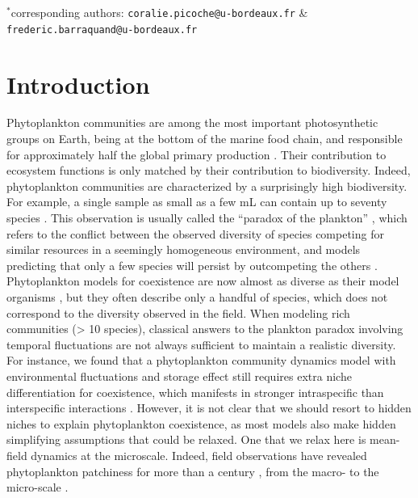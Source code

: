 \documentclass[english]{article}
\begin{document}
$^{*}$corresponding authors: \verb|coralie.picoche@u-bordeaux.fr| \& \verb|frederic.barraquand@u-bordeaux.fr|

\doublespacing

\clearpage{}


\section*{Introduction}

Phytoplankton communities are among the most important photosynthetic
groups on Earth, being at the bottom of the marine food chain, and
responsible for approximately half the global primary production \citep{field_primary_1998}.
Their contribution to ecosystem functions is only matched by their
contribution to biodiversity. Indeed, phytoplankton communities are
characterized by a surprisingly high biodiversity. For example, a
single sample as small as a few mL can contain up to seventy species
\citep{REPHY_db,widdicombe_2021}. This observation is usually called
the ``paradox of the plankton'' \citep{hutchinson_paradox_1961},
which refers to the conflict between the observed diversity of species
competing for similar resources in a seemingly homogeneous environment,
and models predicting that only a few species will persist by outcompeting
the others \citep{macarthur_competition_1964,huisman_biodiversity_1999,schippers_does_2001}.
Phytoplankton models for coexistence are now almost as diverse as
their model organisms \citep{record_paradox_2014}, but they often
describe only a handful of species, which does not correspond to the
diversity observed in the field. When modeling rich communities (\textgreater{}
10 species), classical answers to the plankton paradox involving temporal
fluctuations \citep[e.g.,][]{li_effects_2016,chesson_updates_2018}
are not always sufficient to maintain a realistic diversity. For instance,
we found that a phytoplankton community dynamics model with environmental
fluctuations and storage effect still requires extra niche differentiation
for coexistence, which manifests in stronger intraspecific than interspecific
interactions \citep{picoche_how_2019}. However, it is not clear
that we should resort to hidden niches to explain phytoplankton coexistence,
as most models also make hidden simplifying assumptions that could
be relaxed. One that we relax here is mean-field dynamics at the microscale.
Indeed, field observations have revealed phytoplankton patchiness
for more than a century \citep{bainbridge_size_1957,stocker_marine_2012},
from the macro- to the micro-scale \citep{leonard_interannual_2001,doubell_high-resolution_2006,font-munoz_advection_2017}.
\end{document}
